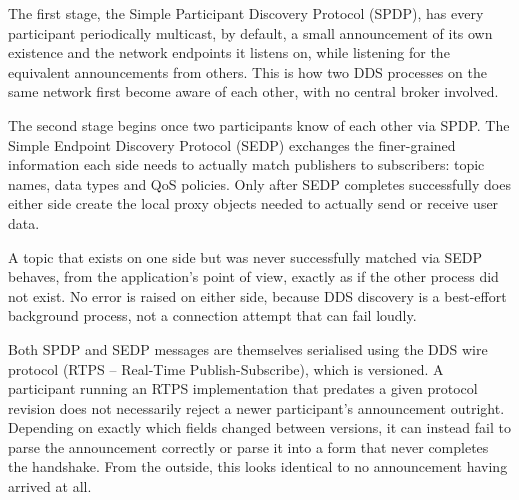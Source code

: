 The first stage, the Simple Participant Discovery Protocol (SPDP),
has every participant periodically multicast, by default, a small
announcement of its own existence and the network endpoints it
listens on, while listening for the equivalent announcements from
others. This is how two DDS processes on the same network first
become aware of each other, with no central broker involved.

The second stage begins once two participants know of each other via
SPDP. The Simple Endpoint Discovery Protocol (SEDP) exchanges the
finer-grained information each side needs to actually match
publishers to subscribers: topic names, data types and QoS
policies. Only after SEDP completes successfully does either side
create the local proxy objects needed to actually send or receive
user data.

A topic that exists on one side but was never successfully matched
via SEDP behaves, from the application's point of view, exactly as
if the other process did not exist. No error is raised on either
side, because DDS discovery is a best-effort background process, not
a connection attempt that can fail loudly.

Both SPDP and SEDP messages are themselves serialised using the DDS
wire protocol (RTPS -- Real-Time Publish-Subscribe), which is
versioned. A participant running an RTPS implementation that
predates a given protocol revision does not necessarily reject a
newer participant's announcement outright. Depending on exactly
which fields changed between versions, it can instead fail to parse
the announcement correctly or parse it into a form that never
completes the handshake. From the outside, this looks identical to
no announcement having arrived at all.

